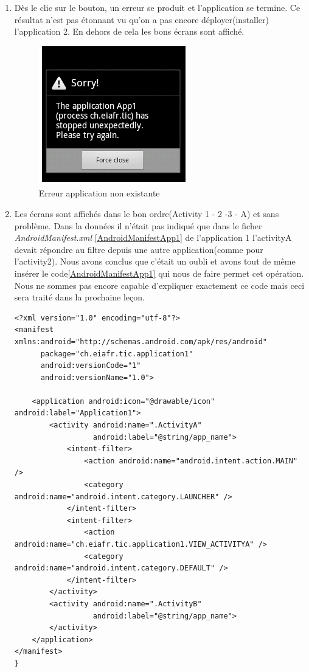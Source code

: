 	\begin{enumerate}
	\item Dès le clic sur le bouton, un erreur se produit et l'application se termine. Ce résultat n'est pas étonnant vu qu'on a pas encore déployer(installer) l'application 2. En dehors de cela les bons écrans sont affiché. 
		\begin{figure}[!h]
				\centering
				\includegraphics[scale=0.5]{./images/error2Notexist.png}
				\caption{Erreur application non existante}
		\end{figure}
		\item Les écrans sont affichés dans le bon ordre(Activity 1 - 2 -3 - A) et sans problème.			
			Dans la données il n'était pas indiqué que dans le ficher \textit{AndroidManifest.xml} \ref{AndroidManifestApp1}  de l'application 1 l'activityA devait répondre au filtre depuis une autre application(comme pour l'activity2). Nous avons conclus que c'était un oubli et avons tout de même insérer le code\ref{AndroidManifestApp1}  qui nous de faire permet cet opération. Nous ne sommes pas encore capable d'expliquer exactement ce code mais ceci sera traité dans la prochaine leçon.
			
			\begin{lstlisting}
<?xml version="1.0" encoding="utf-8"?>
<manifest xmlns:android="http://schemas.android.com/apk/res/android"
      package="ch.eiafr.tic.application1"
      android:versionCode="1"
      android:versionName="1.0">
      
    <application android:icon="@drawable/icon" android:label="Application1">
        <activity android:name=".ActivityA"
                  android:label="@string/app_name">
            <intent-filter>
                <action android:name="android.intent.action.MAIN" />
                <category android:name="android.intent.category.LAUNCHER" />
            </intent-filter>
            <intent-filter>
                <action android:name="ch.eiafr.tic.application1.VIEW_ACTIVITYA" />
                <category android:name="android.intent.category.DEFAULT" />
            </intent-filter>
        </activity>
        <activity android:name=".ActivityB"
                  android:label="@string/app_name">
        </activity>
    </application>
</manifest>
}
\end{lstlisting}


\end{enumerate}
